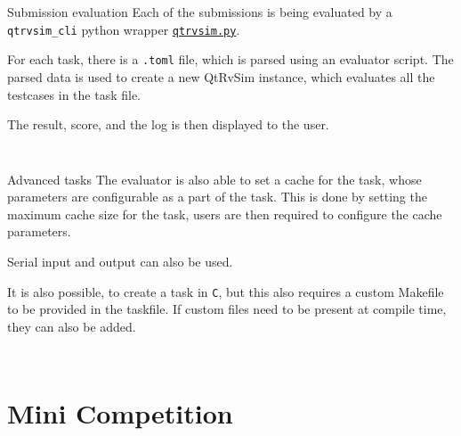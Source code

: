\documentclass{beamer}
\begin{document}
		\begin{frame}{Submission evaluation}
			Each of the submissions is being evaluated by a \texttt{qtrvsim\_cli} python wrapper \href{https://gitlab.fel.cvut.cz/b35apo/qtrvsim-eval-web/-/blob/main/evaluator/qtrvsim.py}{\texttt{qtrvsim.py}}. \par
	
			For each task, there is a \texttt{.toml} file, which is parsed using an evaluator script. The parsed data is used to create a new QtRvSim instance, which evaluates all the testcases in the task file. \par
	
			The result, score, and the log is then displayed to the user.
		\end{frame}
	
		\begin{frame}[fragile]
			\tiny
			\inputminted{python}{examples/5/evaluate.py}
		\end{frame}

		\begin{frame}[fragile]
			\tiny
			\inputminted{toml}{examples/5/task.toml}
		\end{frame}

		\begin{frame}{Advanced tasks}
			The evaluator is also able to set a cache for the task, whose parameters are configurable as a part of the task. This is done by setting the maximum cache size for the task, users are then required to configure the cache parameters. \par

			Serial input and output can also be used. \par

			It is also possible, to create a task in \texttt{C}, but this also requires a custom Makefile to be provided in the taskfile. If custom files need to be present at compile time, they can also be added. \par
		\end{frame}

		\begin{frame}[fragile]
			\small
			\inputminted{toml}{examples/5/cache.toml}
		\end{frame}

		\begin{frame}[fragile]
			\tiny
			\inputminted{toml}{examples/5/complex.toml}
		\end{frame}

	\section{Mini Competition}
\end{document}
